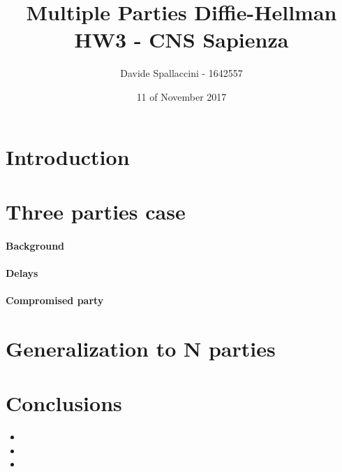 \documentclass[11pt]{article}
\begin{document}
\title{Multiple Parties Diffie-Hellman\\ HW3 - CNS Sapienza}
\author{Davide Spallaccini - 1642557}
\date{11 of November 2017}
\maketitle

\section{Introduction}

\section{Three parties case}

\paragraph*{Background}

\paragraph*{Delays}

\paragraph*{Compromised party}

\section{Generalization to N parties}

\section{Conclusions}

\begin{itemize}
\item 
\item 
\item 
\end{itemize}


\nocite{*} %
 

\end{document}
